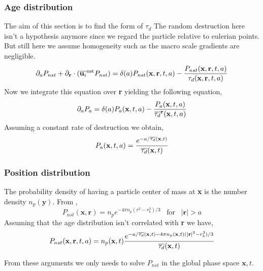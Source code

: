 \subsubsection{Age distribution}
The aim of this section is to find the form of $\tau_d$
The random destruction here isn't a hypothesis anymore since we regard the particle relative to eulerian points. 
But still here we assume homogeneity such as the macro scale gradients are negligible. 
\begin{align*}
    \partial_a P_{nst}
    + \partial_\textbf{r}\cdot  ( \overline{\textbf{u}_i}^\text{nst} P_{nst}) 
    &= \delta(a)P_{nst}(\textbf{x},\textbf{r},t,a)
    - \frac{P_{nst}(\textbf{x},\textbf{r},t,a)}
    {\tau_d(\textbf{x},\textbf{r},t,a)}\\
\end{align*} 
Now we integrate this equation over \textbf{r} yielding the following equation, 
\begin{align*}
    \partial_a P_{a}
    &= \delta(a)P_{a}(\textbf{x},t,a)
    - \frac{P_{a}(\textbf{x},t,a)}
    {\overline{\tau_d}^\textbf{r}(\textbf{x},t,a)}\\
\end{align*} 
Assuming a constant rate of destruction we obtain, 
\begin{align*}
    P_a(\textbf{x},t, a)  
    =\frac{e^{-a/\overline{\tau_d}(\textbf{x},t)}}{\overline{\tau_d}(\textbf{x},t)}
\end{align*} 
\subsubsection{Position distribution}
The probability density of having a particle center of mass at \textbf{x} is the number density $n_p(\textbf{y})$. 
From \citet{zhang2021ensemble}, 
\begin{equation}
    P_{nst}(\textbf{x},\textbf{r})
    = n_p e^{-4\pi n_p (r^3- r_b^3)/3}
\;\;\;
\text{for}
\;\;\;
|\textbf{r}| > a
\end{equation}
Assuming that the age distribution isn't correlated with \textbf{r} we have, 
\begin{equation}
    P_{nst}(\textbf{x},\textbf{r},t,a)
    = n_p(\textbf{x},t) 
    \frac{e^{-a/\overline{\tau_d}(\textbf{x},t) -4\pi n_p(\textbf{x},t) (|\textbf{r}|^3- r_b^3)/3}}{\overline{\tau_d}(\textbf{x},t)}
\end{equation}

From these arguments we only needs to solve $P_{nst}$ in the global phase space $\textbf{x},t$. 